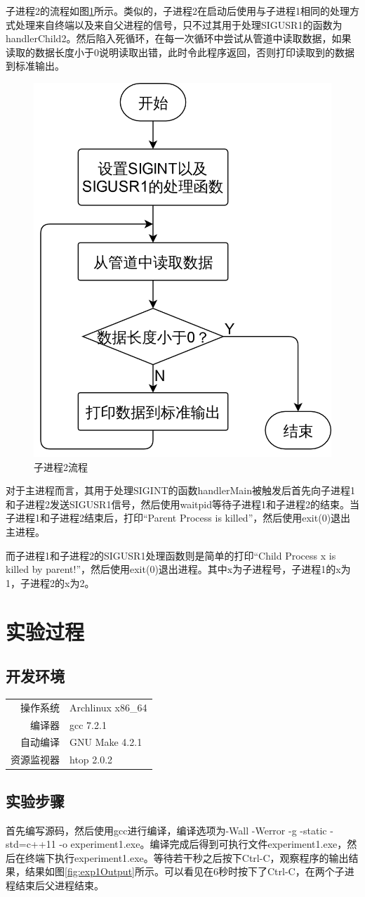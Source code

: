 \documentclass{report}
\begin{document}
子进程2的流程如图\ref{fig:exp1Proc2Flowchart}所示。类似的，子进程2在启动后使用与子进程1相同的处理方式处理来自终端以及来自父进程的信号，只不过其用于处理SIGUSR1的函数为handlerChild2。然后陷入死循环，在每一次循环中尝试从管道中读取数据，如果读取的数据长度小于0说明读取出错，此时令此程序返回，否则打印读取到的数据到标准输出。
\begin{figure}[ht]
    \centering
    \includegraphics[width=0.3\linewidth]{exp1Proc2Flowchart.png}
    \caption{子进程2流程}
    \label{fig:exp1Proc2Flowchart}
\end{figure}

对于主进程而言，其用于处理SIGINT的函数handlerMain被触发后首先向子进程1和子进程2发送SIGUSR1信号，然后使用waitpid等待子进程1和子进程2的结束。当子进程1和子进程2结束后，打印``Parent Process is killed''，然后使用exit(0)退出主进程。\par

而子进程1和子进程2的SIGUSR1处理函数则是简单的打印``Child Process x is killed by parent!''，然后使用exit(0)退出进程。其中x为子进程号，子进程1的x为1，子进程2的x为2。

\section{实验过程}
\label{sec:shi_yan_guo_cheng_1}

\subsection{开发环境}
\label{sub:kai_fa_huan_jing_1}

\begin{tabular}{r l}
    操作系统 & Archlinux x86\_64 \\
    编译器 & gcc 7.2.1 \\
    自动编译 & GNU Make 4.2.1 \\
    资源监视器 & htop 2.0.2 \\
\end{tabular}

\subsection{实验步骤}
\label{sub:shi_yan_bu_zou_1}
首先编写源码，然后使用gcc进行编译，编译选项为-Wall -Werror -g -static -std=c++11 -o experiment1.exe。编译完成后得到可执行文件experiment1.exe，然后在终端下执行experiment1.exe。等待若干秒之后按下Ctrl-C，观察程序的输出结果，结果如图\ref{fig:exp1Output}所示。可以看见在6秒时按下了Ctrl-C，在两个子进程结束后父进程结束。
\end{document}
